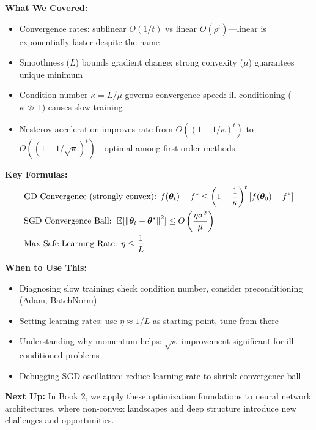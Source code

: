 \documentclass[../../main.tex]{subfiles}
\begin{document}
\begin{chaptersummary}
\textbf{What We Covered:}
\begin{itemize}
    \item Convergence rates: sublinear $O(1/t)$ vs linear $O(\rho^t)$---linear is exponentially faster despite the name
    \item Smoothness ($L$) bounds gradient change; strong convexity ($\mu$) guarantees unique minimum
    \item Condition number $\kappa = L/\mu$ governs convergence speed: ill-conditioning ($\kappa \gg 1$) causes slow training
    \item Nesterov acceleration improves rate from $O((1-1/\kappa)^t)$ to $O((1-1/\sqrt{\kappa})^t)$---optimal among first-order methods
\end{itemize}

\textbf{Key Formulas:}
\begin{align*}
    &\text{GD Convergence (strongly convex): } f(\boldsymbol{\theta}_t) - f^* \leq \left(1 - \frac{1}{\kappa}\right)^t [f(\boldsymbol{\theta}_0) - f^*] \\
    &\text{SGD Convergence Ball: } \operatorname{\mathbb{E}}[\left\lVert \boldsymbol{\theta}_t - \boldsymbol{\theta}^* \right\rVert^2] \leq O\left(\frac{\eta \sigma^2}{\mu}\right) \\
    &\text{Max Safe Learning Rate: } \eta \leq \frac{1}{L}
\end{align*}

\textbf{When to Use This:}
\begin{itemize}
    \item Diagnosing slow training: check condition number, consider preconditioning (Adam, BatchNorm)
    \item Setting learning rates: use $\eta \approx 1/L$ as starting point, tune from there
    \item Understanding why momentum helps: $\sqrt{\kappa}$ improvement significant for ill-conditioned problems
    \item Debugging SGD oscillation: reduce learning rate to shrink convergence ball
\end{itemize}

\textbf{Next Up:} In Book 2, we apply these optimization foundations to neural network architectures, where non-convex landscapes and deep structure introduce new challenges and opportunities.
\end{chaptersummary}
\end{document}
